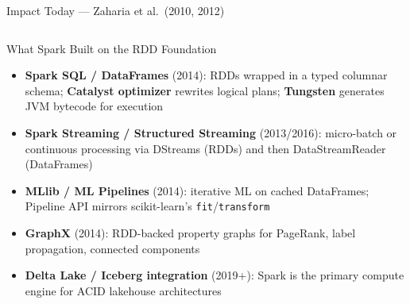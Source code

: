 \documentclass[aspectratio=169,10pt]{beamer}
\begin{document}
\begin{frame}{Impact Today — Zaharia et al.\ (2010, 2012)}
  \begin{columns}[T]
      \begin{block}{What Spark Built on the RDD Foundation}
        \begin{itemize}
          \item \textbf{Spark SQL / DataFrames} (2014):
                RDDs wrapped in a typed columnar schema;
                \textbf{Catalyst optimizer} rewrites logical plans;
                \textbf{Tungsten} generates JVM bytecode for execution
          \item \textbf{Spark Streaming / Structured Streaming} (2013/2016):
                micro-batch or continuous processing via DStreams
                (RDDs) and then DataStreamReader (DataFrames)
          \item \textbf{MLlib / ML Pipelines} (2014):
                iterative ML on cached DataFrames; Pipeline API
                mirrors scikit-learn's \texttt{fit}/\texttt{transform}
          \item \textbf{GraphX} (2014): RDD-backed property graphs
                for PageRank, label propagation, connected components
          \item \textbf{Delta Lake / Iceberg integration} (2019+):
                Spark is the primary compute engine for ACID
                lakehouse architectures
        \end{itemize}
      \end{block}


\end{columns}
\end{frame}
\end{document}

